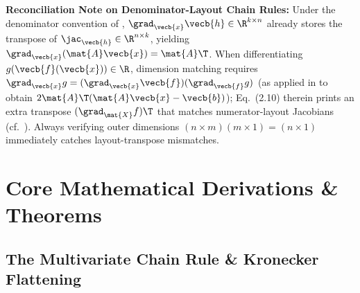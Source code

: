 \documentclass[../../../../master.tex]{subfiles}
\begin{document}
\begin{crossbook}
\vspace{4pt}
\textbf{Reconciliation Note on Denominator-Layout Chain Rules:} Under the denominator convention of ,
$\grad_{\vecb{x}}\vecb{h} \in \R^{k\times n}$ already stores the transpose of
$\jac_{\vecb{h}} \in \R^{n\times k}$, yielding $\grad_{\vecb{x}}(\mat{A}\vecb{x}) = \mat{A}\T$.
When differentiating $g(\vecb{f}(\vecb{x})) \in \R$, dimension matching requires
$\grad_{\vecb{x}} g = (\grad_{\vecb{x}} \vecb{f})(\grad_{\vecb{f}} g)$ (as applied in
 to obtain
$2\mat{A}\T(\mat{A}\vecb{x}-\vecb{b})$); Eq.~(2.10) therein prints an extra
transpose $(\grad_{\mat{X}} f)\T$ that matches numerator-layout Jacobians
(cf.\ ).
Always verifying outer dimensions $(n \times m)(m \times 1) = (n \times 1)$
immediately catches layout-transpose mismatches.
\end{crossbook}

\section{Core Mathematical Derivations \& Theorems}
\label{sec:matcalc:derivations}

\subsection{The Multivariate Chain Rule \& Kronecker Flattening}
\label{subsec:matcalc:chain}
\end{document}
